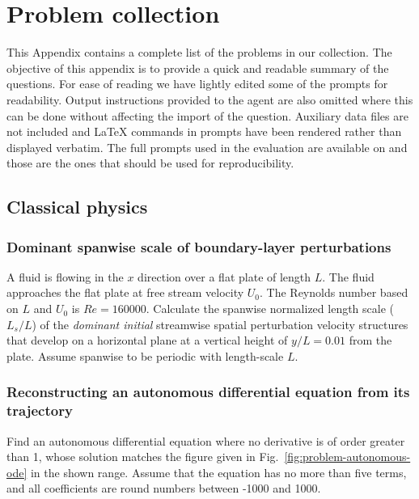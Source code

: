 \begingroup
\ProblemAppendixSetup
\section{Problem collection}
\label{app:problems}

This Appendix contains a complete list of the problems in our collection. The objective of this appendix is to provide a quick and readable summary of the questions.  For ease of reading we have lightly edited some of the prompts for readability.  Output instructions provided to the agent are also omitted where this can be done without affecting the import of the question. Auxiliary data files are not included and LaTeX commands in prompts have been rendered rather than displayed verbatim. The full prompts used in the evaluation are available on \benchmarkrepo{} and those are the ones that should be used for reproducibility.

\subsection{Classical physics}
\label{problems:classical-dynamics}

\subsubsection{Dominant spanwise scale of boundary-layer perturbations}
\label{problem:boundary-layer-perturbations}
A fluid is flowing in the $x$ direction over a flat plate of length
$L$. The fluid approaches the flat plate at free stream velocity
$U_0$. The Reynolds number based on $L$ and $U_0$ is $Re=160000$.
Calculate the spanwise normalized length scale ($L_s/L$) of the {\em
dominant initial} streamwise spatial perturbation velocity structures
that develop on a horizontal plane at a vertical height of $y/L=0.01$
from the plate. Assume spanwise to be periodic with length-scale $L$.

\subsubsection{Reconstructing an autonomous differential equation from its trajectory}
\label{problem:autonomous-ode}
Find an autonomous differential equation where no derivative is of order greater than 1, whose solution matches the figure given in Fig.~\ref{fig:problem-autonomous-ode} in the shown range. Assume that the equation has no more than five terms, and all coefficients are round numbers between -1000 and 1000. 

